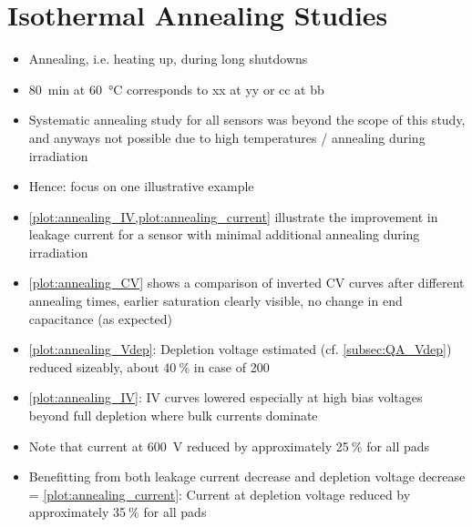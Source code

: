 \section{Isothermal Annealing Studies}
\label{sec:annealing}

\begin{itemize}
	\item Annealing, i.e. heating up, during long shutdowns
	\item \SI{80}{\minute} at \SI{60}{\celsius} corresponds to xx at yy or cc at bb
	\item Systematic annealing study for all sensors was beyond the scope of this study, and anyways not possible due to high temperatures / annealing during irradiation
	\item Hence: focus on one illustrative example
	\item \ref{plot:annealing_IV,plot:annealing_current} illustrate the improvement in leakage current for a sensor with minimal additional annealing during irradiation
	\item \ref{plot:annealing_CV} shows a comparison of inverted CV curves after different annealing times, earlier saturation clearly visible, no change in end capacitance (as expected)
	\item \ref{plot:annealing_Vdep}: Depletion voltage estimated (cf. \ref{subsec:QA_Vdep}) reduced sizeably, about 40$~\%$ in case of \SI{200}{\micron}
	\item \ref{plot:annealing_IV}: IV curves lowered especially at high bias voltages beyond full depletion where bulk currents dominate
	\item Note that current at \SI{600}{\volt} reduced by approximately 25$~\%$ for all pads
	\item Benefitting from both leakage current decrease and depletion voltage decrease = \ref{plot:annealing_current}: Current at depletion voltage reduced by approximately 35$~\%$ for all pads
\end{itemize}

